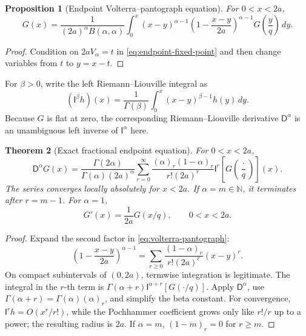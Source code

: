 \documentclass[11pt]{article}
\newtheorem{theorem}{Theorem}[section]
\newtheorem{proposition}[theorem]{Proposition}
\theoremstyle{definition}
\theoremstyle{remark}
\newcommand{\N}{\mathbb{N}}
\newcommand{\Iop}{\mathsf{I}}
\newcommand{\Dop}{\mathsf{D}}
\newcommand{\poch}[2]{\left(#1\right)_{#2}}
\begin{document}
\begin{proposition}[Endpoint Volterra--pantograph equation]
\label{prop:volterra}
For \(0<x<2a\),
\begin{equation}
 G(x)=\frac1{(2a)^\alpha B(\alpha,\alpha)}
 \int_0^x(x-y)^{\alpha-1}
 \left(1-\frac{x-y}{2a}\right)^{\alpha-1}
 G\left(\frac yq\right)\,dy.
 \label{eq:volterra-pantograph}
\end{equation}
\end{proposition}

\begin{proof}
Condition on \(2aV_\alpha=t\) in \eqref{eq:endpoint-fixed-point} and then
change variables from \(t\) to \(y=x-t\).
\end{proof}

For \(\beta>0\), write the left Riemann--Liouville integral as
\begin{equation}
 (\Iop^\beta h)(x)
 =\frac1{\Gamma(\beta)}\int_0^x(x-y)^{\beta-1}h(y)\,dy.
 \label{eq:RL-integral}
\end{equation}
Because \(G\) is flat at zero, the corresponding Riemann--Liouville derivative
\(\Dop^\alpha\) is an unambiguous left inverse of \(\Iop^\alpha\) here.

\begin{theorem}[Exact fractional endpoint equation]
\label{thm:fractional-pantograph}
For \(0<x<2a\),
\begin{equation}
\boxed{
 \Dop^\alpha G(x)
 =\frac{\Gamma(2\alpha)}{\Gamma(\alpha)(2a)^\alpha}
 \sum_{r=0}^{\infty}
 \frac{\poch{\alpha}{r}\poch{1-\alpha}{r}}
 {r!(2a)^r}
 \Iop^r\!\left[G\left(\frac{\cdot}{q}\right)\right](x).}
 \label{eq:fractional-endpoint-equation}
\end{equation}
The series converges locally absolutely for \(x<2a\).  If
\(\alpha=m\in\N\), it terminates after \(r=m-1\).  For \(\alpha=1\),
\begin{equation}
 G'(x)=\frac1{2a}G(x/q),\qquad 0<x<2a.
 \label{eq:uniform-endpoint-G}
\end{equation}
\end{theorem}

\begin{proof}
Expand the second factor in \eqref{eq:volterra-pantograph}:
\[
 \left(1-\frac{x-y}{2a}\right)^{\alpha-1}
 =\sum_{r\ge0}\frac{\poch{1-\alpha}{r}}{r!(2a)^r}(x-y)^r.
\]
On compact subintervals of \((0,2a)\), termwise integration is legitimate.
The integral in the \(r\)-th term is
\(\Gamma(\alpha+r)\Iop^{\alpha+r}[G(\cdot/q)]\).  Apply
\(\Dop^\alpha\), use
\(\Gamma(\alpha+r)=\Gamma(\alpha)\poch{\alpha}{r}\), and simplify the beta
constant.  For convergence, \(\Iop^rh=O(x^r/r!)\), while the Pochhammer
coefficient grows only like \(r!/r\) up to a power; the resulting radius is
\(2a\).  If \(\alpha=m\), \(\poch{1-m}{r}=0\) for \(r\ge m\).
\end{proof}
\end{document}
